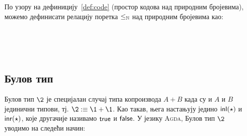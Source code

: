 По узору на дефиницију~\ref{def:code} (простор кодова над природним бројевима), можемо дефинисати релацију поретка $\leq_{\mathbb{N}}$ над природним бројевима као:
\begin{code}%
\>[0]\AgdaSpace{}%
\AgdaSymbol{:}\AgdaSpace{}%
\AgdaSpace{}%
\AgdaSpace{}%
\AgdaSpace{}%
\AgdaSpace{}%
\AgdaSpace{}%
\<%
\\
\>[0]\AgdaSpace{}%
\AgdaSpace{}%
\AgdaSpace{}%
\AgdaSymbol{=}\AgdaSpace{}%
\<%
\\
\>[0]\AgdaSpace{}%
\AgdaSpace{}%
\AgdaSpace{}%
\AgdaSpace{}%
\AgdaSymbol{=}\AgdaSpace{}%
\<%
\\
\>[0]\AgdaSpace{}%
\AgdaSpace{}%
\AgdaSpace{}%
\AgdaSpace{}%
\AgdaSpace{}%
\AgdaSymbol{=}\AgdaSpace{}%
\AgdaSpace{}%
\AgdaSpace{}%
\<%
\end{code}

\subsection{Булов тип}

Булов тип $\2$ је специјалан случај типа копроизвода $A + B$ када су и $A$ и $B$ јединични типови, тј. $\2 :\equiv \1 + \1$. Као такав, њега настањују једино $\mathsf{inl}(\star)$ и $\mathsf{inr}(\star)$, које другачије називамо $\mathsf{true}$ и $\mathsf{false}$. У језику \textsc{Agda}, Булов тип $\2$ уводимо на следећи начин: 
\begin{code}%
\>[0]\AgdaSpace{}%
\AgdaSymbol{:}\AgdaSpace{}%
\AgdaSpace{}%
\<%
\\
\>[0]\AgdaSpace{}%
\AgdaSymbol{=}\AgdaSpace{}%
\AgdaSpace{}%
\AgdaOperator{\AgdaDatatype{+}}\AgdaSpace{}%
\<%
\\
%
\\[\AgdaEmptyExtraSkip]%
\>[0]\AgdaSpace{}%
%
\>[14]\AgdaSymbol{=}\AgdaSpace{}%
\AgdaSpace{}%
\<%
\\
\>[0]\AgdaSpace{}%
\AgdaSpace{}%
\AgdaSymbol{=}\AgdaSpace{}%
\AgdaSpace{}%
\<%
\end{code}

